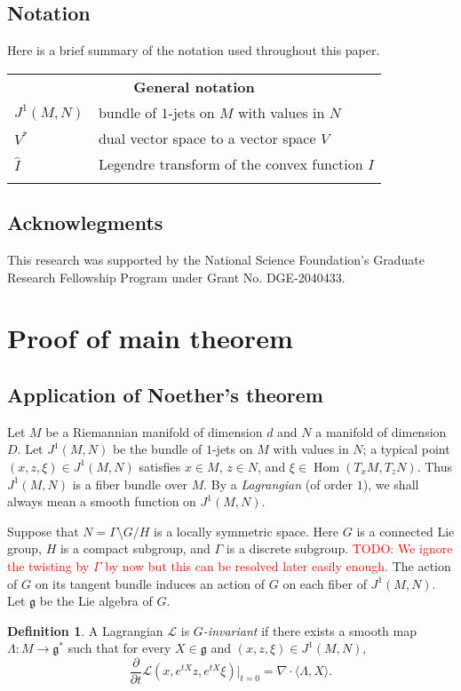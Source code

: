 \documentclass[reqno,11pt]{amsart}
\DeclareMathOperator{\Hom}{Hom}
\newcommand{\Lagrange}{\mathscr L}
\newcommand{\dfn}[1]{\emph{#1}\index{#1}}
\theoremstyle{definition}
\newtheorem{definition}[theorem]{Definition}
\numberwithin{equation}{section}
\newcommand\todo[1]{\textcolor{red}{TODO: #1}}
\begin{document}
\subsection{Notation}
Here is a brief summary of the notation used throughout this paper.

\begin{longtable}{@{\extracolsep{\fill}}lp{}}
\multicolumn{2}{c}{\textbf{General notation}}\\[4pt]
$J^1(M, N)$ & bundle of $1$-jets on $M$ with values in $N$ \\
$V^*$ & dual vector space to a vector space $V$ \\
$\hat I$ & Legendre transform of the convex function $I$ \\
\\
\end{longtable}

\subsection{Acknowlegments}
This research was supported by the National Science Foundation's Graduate Research Fellowship Program under Grant No. DGE-2040433.

\section{Proof of main theorem}
\subsection{Application of Noether's theorem}
Let $M$ be a Riemannian manifold of dimension $d$ and $N$ a manifold of dimension $D$.
Let $J^1(M, N)$ be the bundle of $1$-jets on $M$ with values in $N$; a typical point $(x, z, \xi) \in J^1(M, N)$ satisfies $x \in M$, $z \in N$, and $\xi \in \Hom(T_x M, T_z N)$.
Thus $J^1(M, N)$ is a fiber bundle over $M$.
By a \dfn{Lagrangian} (of order $1$), we shall always mean a smooth function on $J^1(M, N)$.

Suppose that $N = \Gamma \setminus G/H$ is a locally symmetric space.
Here $G$ is a connected Lie group, $H$ is a compact subgroup, and $\Gamma$ is a discrete subgroup.
\todo{We ignore the twisting by $\Gamma$ by now but this can be resolved later easily enough.}
The action of $G$ on its tangent bundle induces an action of $G$ on each fiber of $J^1(M, N)$.
Let $\mathfrak g$ be the Lie algebra of $G$.

\begin{definition}
A Lagrangian $\Lagrange$ is \dfn{$G$-invariant} if there exists a smooth map $\Lambda: M \to \mathfrak g^*$ such that for every $X \in \mathfrak g$ and $(x, z, \xi) \in J^1(M, N)$,
$$\frac{\partial}{\partial t} \Lagrange(x, e^{tX}z, e^{tX} \xi)\bigg|_{t = 0} = \nabla \cdot \langle \Lambda, X\rangle.$$
\end{definition}
\end{document}

